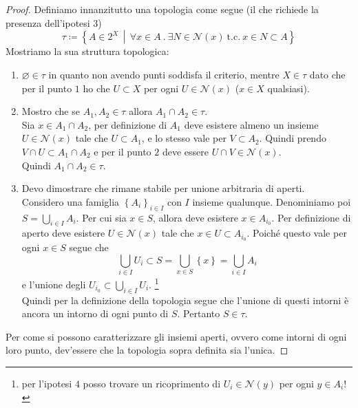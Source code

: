 \begin{proof}
	Definiamo innanzitutto una topologia come segue (il che richiede la presenza dell'ipotesi $3$)
	\begin{equation*}
		\tau \coloneqq \left\{ A \in 2^X \,\middle|\, \forall x \in A\ . \ \exists N \in \mathcal{N}(x)\ \text{t.c.}\ x \in N \subset A \right\}
	\end{equation*}
	Mostriamo la sua struttura topologica:
	\begin{enumerate}
		\item $\varnothing \in \tau$ in quanto non avendo punti soddisfa il criterio, mentre $X \in \tau$ dato che per il punto $1$ ho che $U \subset X$ per ogni $U \in \mathcal{N}(x)$ ($x \in X$ qualsiasi).
		\item Mostro che se $A_1, A_2 \in \tau$ allora $A_1 \cap A_2 \in \tau$. \\ Sia $x \in A_1 \cap A_2$, per definizione di $A_1$ deve esistere almeno un insieme $U \in \mathcal{N}(x)$ tale che $U \subset A_1$, e lo stesso vale per $V \subset A_2$. Quindi prendo $V \cap U \subset A_1 \cap A_2$ e per il punto $2$ deve essere $U \cap V \in \mathcal{N}(x)$. \\ Quindi $A_1 \cap A_2 \in \tau$.
		\item Devo dimostrare che rimane stabile per unione arbitraria di aperti. \\ Considero una famiglia $\left\{A_i\right\}_{i \in I}$ con $I$ insieme qualunque. Denominiamo poi $S = \bigcup_{i \in I} A_i$. Per cui sia $x \in S$, allora deve esistere $x \in A_{i_0}$. Per definizione di aperto deve esistere $U\in \mathcal{N}(x)$ tale che $x \in U \subset A_{i_0}$. Poiché questo vale per ogni $x \in S$ segue che
		\begin{equation*}
			\bigcup_{i \in I} U_i \subset  S = \bigcup_{x \in S} \left\{x\right\} = \bigcup_{i \in I} A_i 
		\end{equation*}
		e l'unione degli $U_{i_0} \subset \bigcup_{i \in I} U_i$. 
		\footnote{per l'ipotesi $4$ posso trovare un ricoprimento di $U_i \in \mathcal{N}(y)$ per ogni $y \in A_i$!}
		\\
		 Quindi per la definizione della topologia segue che l'unione di questi intorni è ancora un intorno di ogni punto di $S$. Pertanto $S \in \tau$.
	\end{enumerate}
	Per come si possono caratterizzare gli insiemi aperti, ovvero come intorni di ogni loro punto, dev'essere che la topologia sopra definita sia l'unica.  
\end{proof}



